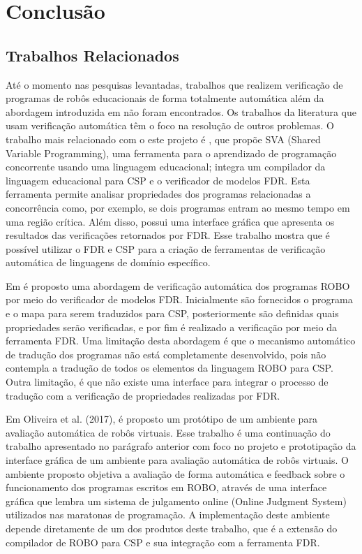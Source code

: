 \chapter{Conclusão}
\section{Trabalhos Relacionados}

Até o momento nas pesquisas levantadas, trabalhos que realizem verificação de programas de robôs educacionais de forma totalmente automática além da abordagem introduzida em \cite{nogueira} não foram encontrados. Os trabalhos da literatura que usam verificação automática têm o foco na resolução de outros problemas. O trabalho mais relacionado com o este projeto é \cite{SVA}, que propõe SVA (Shared Variable Programming), uma ferramenta para o aprendizado de programação concorrente usando uma linguagem educacional; integra um compilador da linguagem educacional para CSP e o verificador de modelos FDR. Esta ferramenta permite analisar propriedades dos programas relacionadas a concorrência como, por exemplo, se dois programas entram ao mesmo tempo em uma região crítica. Além disso, possui uma interface gráfica que apresenta os resultados das verificações retornados por FDR. Esse trabalho mostra que é possível utilizar o FDR e CSP para a criação de ferramentas de verificação automática de linguagens de domínio específico. 

Em \cite{nogueira} é proposto uma abordagem de verificação automática dos programas ROBO por meio do verificador de modelos FDR. Inicialmente são fornecidos o programa e o mapa para serem traduzidos para CSP, posteriormente são definidas quais propriedades serão verificadas, e por fim é realizado a verificação por meio da ferramenta FDR. Uma limitação desta abordagem é que o mecanismo automático de tradução dos programas não está completamente desenvolvido, pois não contempla a tradução de todos os elementos da linguagem ROBO para CSP. Outra limitação, é que não existe uma interface para integrar o processo de tradução com a verificação de propriedades realizadas por FDR.

Em Oliveira et al. (2017), é proposto um protótipo de um ambiente para avaliação automática de robôs virtuais. Esse trabalho é uma continuação do trabalho apresentado no parágrafo anterior com foco no projeto e prototipação da interface gráfica de um ambiente para avaliação automática de robôs virtuais. O ambiente proposto objetiva a avaliação de forma automática e feedback sobre o funcionamento dos programas escritos em ROBO, através de uma interface gráfica que lembra um sistema de julgamento online (Online Judgment System) utilizados nas maratonas de programação. A implementação deste ambiente depende diretamente de um dos produtos deste trabalho, que é a extensão do compilador de ROBO para CSP e sua integração com a ferramenta FDR.

